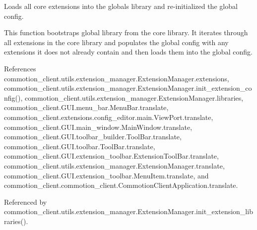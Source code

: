 \begin{DoxyVerb}Loads all core extensions into the globals library and re-initialized the global config.

This function bootstraps global library from the core library. It iterates through all extensions in the core library and populates the global config with any extensions it does not already contain and then loads them into the global config.\end{DoxyVerb}
 

References commotion\-\_\-client.\-utils.\-extension\-\_\-manager.\-Extension\-Manager.\-extensions, commotion\-\_\-client.\-utils.\-extension\-\_\-manager.\-Extension\-Manager.\-init\-\_\-extension\-\_\-config(), commotion\-\_\-client.\-utils.\-extension\-\_\-manager.\-Extension\-Manager.\-libraries, commotion\-\_\-client.\-G\-U\-I.\-menu\-\_\-bar.\-Menu\-Bar.\-translate, commotion\-\_\-client.\-extensions.\-config\-\_\-editor.\-main.\-View\-Port.\-translate, commotion\-\_\-client.\-G\-U\-I.\-main\-\_\-window.\-Main\-Window.\-translate, commotion\-\_\-client.\-G\-U\-I.\-toolbar\-\_\-builder.\-Tool\-Bar.\-translate, commotion\-\_\-client.\-G\-U\-I.\-toolbar.\-Tool\-Bar.\-translate, commotion\-\_\-client.\-G\-U\-I.\-extension\-\_\-toolbar.\-Extension\-Tool\-Bar.\-translate, commotion\-\_\-client.\-utils.\-extension\-\_\-manager.\-Extension\-Manager.\-translate, commotion\-\_\-client.\-G\-U\-I.\-extension\-\_\-toolbar.\-Menu\-Item.\-translate, and commotion\-\_\-client.\-commotion\-\_\-client.\-Commotion\-Client\-Application.\-translate.



Referenced by commotion\-\_\-client.\-utils.\-extension\-\_\-manager.\-Extension\-Manager.\-init\-\_\-extension\-\_\-libraries().


